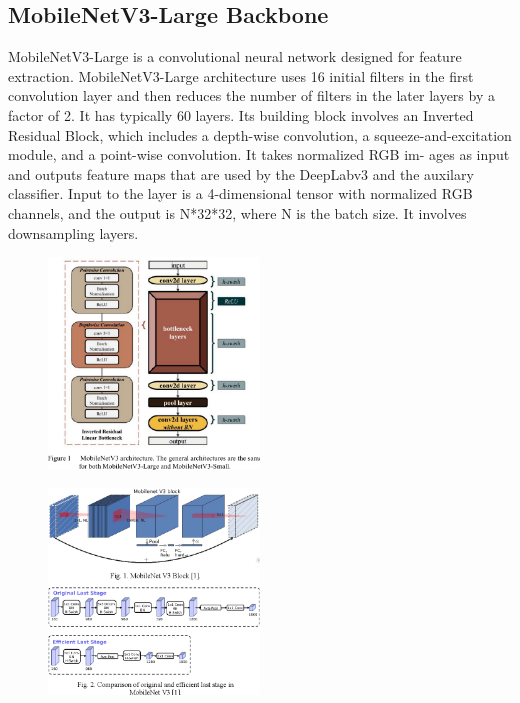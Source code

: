 \subsection{MobileNetV3-Large Backbone}

MobileNetV3-Large is a convolutional neural network designed for feature extraction. MobileNetV3-Large architecture uses 16 initial filters in the first convolution layer and then reduces the number of filters in the later layers by a factor of 2. It has typically 60 layers. Its building block involves an Inverted Residual Block, which includes a depth-wise convolution, a squeeze-and-excitation module, and a point-wise convolution. It takes normalized RGB im-
ages as input and outputs feature maps that are used by the
DeepLabv3 and the auxilary classifier. Input to the layer is
a 4-dimensional tensor with normalized RGB channels, and
the output is N*32*32, where N is the batch size. It involves downsampling layers.

\begin{figure}[ht]
    \centering
    \includegraphics[width=0.5\textwidth]{Images/mobilenet-1.png}
    \caption{\cite{mobilenet-1}}
    \label{fig:mobilenet-1}
\end{figure}

\begin{figure}[ht]
    \centering
    \includegraphics[width=0.5\textwidth]{Images/mobilenet-2.png}
    \caption{\cite{mobilenet-2}}
    \label{fig:mobilenet-2}
\end{figure}


